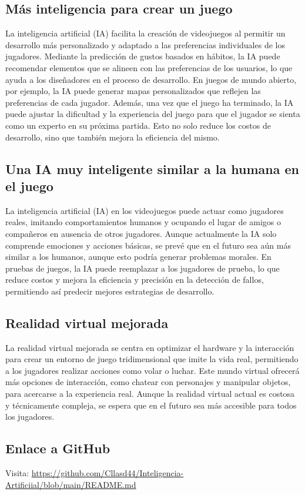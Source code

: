 \documentclass{article}
\begin{document}
\subsection{Más inteligencia para crear un juego}
La inteligencia artificial (IA) facilita la creación de videojuegos al permitir un desarrollo más personalizado y adaptado a las preferencias individuales de los jugadores. Mediante la predicción de gustos basados en hábitos, la IA puede recomendar elementos que se alineen con las preferencias de los usuarios, lo que ayuda a los diseñadores en el proceso de desarrollo. En juegos de mundo abierto, por ejemplo, la IA puede generar mapas personalizados que reflejen las preferencias de cada jugador. Además, una vez que el juego ha terminado, la IA puede ajustar la dificultad y la experiencia del juego para que el jugador se sienta como un experto en su próxima partida. Esto no solo reduce los costos de desarrollo, sino que también mejora la eficiencia del mismo.

\subsection{Una IA muy inteligente similar a la humana en el juego}
La inteligencia artificial (IA) en los videojuegos puede actuar como jugadores reales, imitando comportamientos humanos y ocupando el lugar de amigos o compañeros en ausencia de otros jugadores. Aunque actualmente la IA solo comprende emociones y acciones básicas, se prevé que en el futuro sea aún más similar a los humanos, aunque esto podría generar problemas morales. En pruebas de juegos, la IA puede reemplazar a los jugadores de prueba, lo que reduce costos y mejora la eficiencia y precisión en la detección de fallos, permitiendo así predecir mejores estrategias de desarrollo.

\subsection{Realidad virtual mejorada}
La realidad virtual mejorada se centra en optimizar el hardware y la interacción para crear un entorno de juego tridimensional que imite la vida real, permitiendo a los jugadores realizar acciones como volar o luchar. Este mundo virtual ofrecerá más opciones de interacción, como chatear con personajes y manipular objetos, para acercarse a la experiencia real. Aunque la realidad virtual actual es costosa y técnicamente compleja, se espera que en el futuro sea más accesible para todos los jugadores.

\subsection{Enlace a GitHub}

Visita: \url{https://github.com/Cllasd44/Inteligencia-Artificiial/blob/main/README.md}
\end{document}
